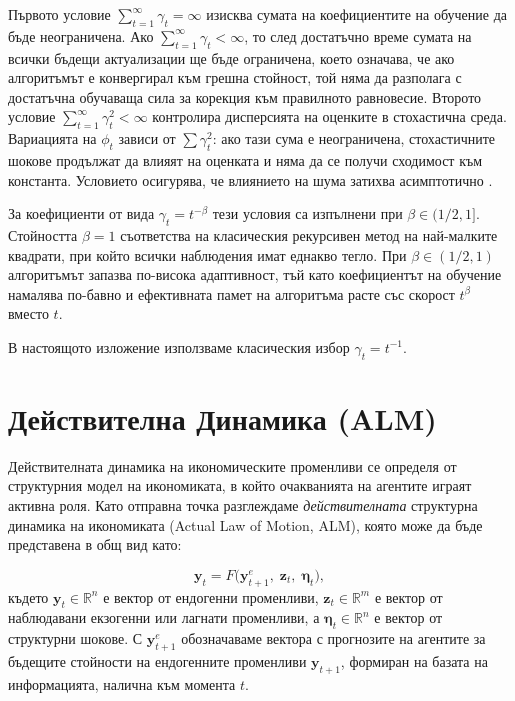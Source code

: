 Първото условие $\sum_{t=1}^{\infty} \gamma_t = \infty$ изисква сумата на коефициентите на обучение да бъде неограничена. Ако $\sum_{t=1}^{\infty} \gamma_t < \infty$, то след достатъчно време сумата на всички бъдещи актуализации ще бъде ограничена, което означава, че ако алгоритъмът е конвергирал към грешна стойност, той няма да разполага с достатъчна обучаваща сила за корекция към правилното равновесие. Второто условие $\sum_{t=1}^{\infty} \gamma_t^2 < \infty$ контролира дисперсията на оценките в стохастична среда. Вариацията на $\phi_t$ зависи от $\sum \gamma_t^2$: ако тази сума е неограничена, стохастичните шокове продължат да влияят на оценката и няма да се получи сходимост към константа. Условието осигурява, че влиянието на шума затихва асимптотично \parencite[с. 124]{GeorgeEvans_2001}.

За коефициенти от вида $\gamma_t = t^{-\beta}$ тези условия са изпълнени при $\beta \in (1/2, 1]$. Стойността $\beta = 1$ съответства на класическия рекурсивен метод на най-малките квадрати, при който всички наблюдения имат еднакво тегло. При $\beta \in (1/2, 1)$ алгоритъмът запазва по-висока адаптивност, тъй като коефициентът на обучение намалява по-бавно и ефективната памет на алгоритъма расте със скорост $t^\beta$ вместо $t$.

В настоящото изложение използваме класическия избор $\gamma_t = t^{-1}$.

\section{Действителна Динамика (ALM)}

Действителната динамика на икономическите променливи се определя от структурния модел на икономиката, в който очакванията на агентите играят активна роля. Като отправна точка разглеждаме \emph{действителната} структурна динамика на икономиката (Actual Law of Motion, ALM), която може да бъде представена в общ вид като:

\begin{equation}
\mathbf{y}_t = F\bigl( \mathbf{y}_{t+1}^e,\; \mathbf{z}_{t},\; \boldsymbol{\eta}_t \bigr),
\label{eq:structural_model}
\end{equation}
където $\mathbf{y}_t \in \mathbb{R}^n$ е вектор от ендогенни променливи, $\mathbf{z}_{t} \in \mathbb{R}^m$ е вектор от наблюдавани екзогенни или лагнати променливи, а $\boldsymbol{\eta}_t \in \mathbb{R}^n$ е вектор от структурни шокове. С $\mathbf{y}_{t+1}^e$ обозначаваме вектора с прогнозите на агентите за бъдещите стойности на ендогенните променливи $\mathbf{y}_{t+1}$, формиран на базата на информацията, налична към момента $t$.

